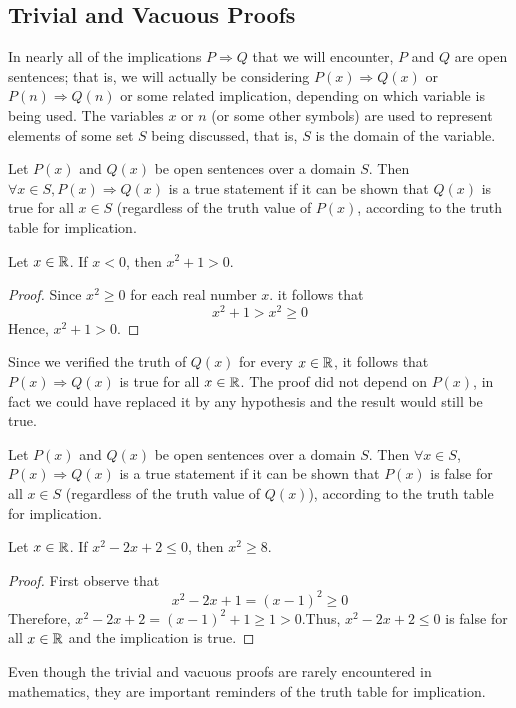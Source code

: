 \subsection{Trivial and Vacuous Proofs}
In nearly all of the implications $P \Rightarrow Q$ that we will encounter, $P$
and $Q$ are open sentences; that is, we will actually be considering $P(x)
\Rightarrow Q(x)$ or $P(n) \Rightarrow Q(n)$ or some related implication,
depending on which variable is being used. The variables $x$ or $n$ (or some other
symbols) are used to represent elements of some set $S$ being discussed, that is,
$S$ is the domain of the variable.
\begin{defi}
    Let $P(x)$ and $Q(x)$ be open sentences over a domain $S$. Then $\forall x
    \in S, P(x) \Rightarrow Q(x)$ is a true statement if it can be shown that
    $Q(x)$ is true for all $x \in S$ (regardless of the truth value of $P(x)$,
    according to the truth table for implication.
\end{defi}
\begin{eg}
     Let $x \in \mathbb{R}$. If $x<0$, then $x^2+1>0$.
     \begin{proof}
          Since $x^2 \geq 0$ for each real number $x$. it follows that 
          \begin{equation*}
              x^2+1>x^2 \geq 0
          \end{equation*}
          Hence, $x^2+1>0$.
     \end{proof} 
\end{eg}
Since  we verified the truth of $Q(x)$ for every $x \in \mathbb{R}$, it follows that
$P(x) \Rightarrow Q(x)$ is true for all $x \in \mathbb{R}$. The proof did not depend on
$P(x)$, in fact we could have replaced it by any hypothesis and the result would
still be true.  
\begin{defi}
    Let $P(x)$ and $Q(x)$ be open sentences over a domain $S$. Then $\forall x
    \in S$, $P(x) \Rightarrow Q(x)$ is a true statement if it can be shown that
    $P(x)$ is false for all $x \in S$ (regardless of the truth value of $Q(x)$),
    according to the truth table for implication.
\end{defi}
\begin{eg}
     Let $x\in\mathbb{R}$. If $x^2-2x+2\leq0$,  then $x^2\geq8$.
     \begin{proof}
          First observe that
          \begin{equation*}
              x^2-2x+1 = (x-1)^2 \geq 0
          \end{equation*}
          Therefore, $x^2-2x+2 = (x-1)^2+1\geq1>0$.Thus, $x^2-2x+2 \leq 0$ is false for 
          all $x \in \mathbb{R}$ and the implication is true.
     \end{proof}
\end{eg}
Even though the trivial and vacuous proofs are rarely encountered in mathematics,
they are important reminders of the truth table for implication.

